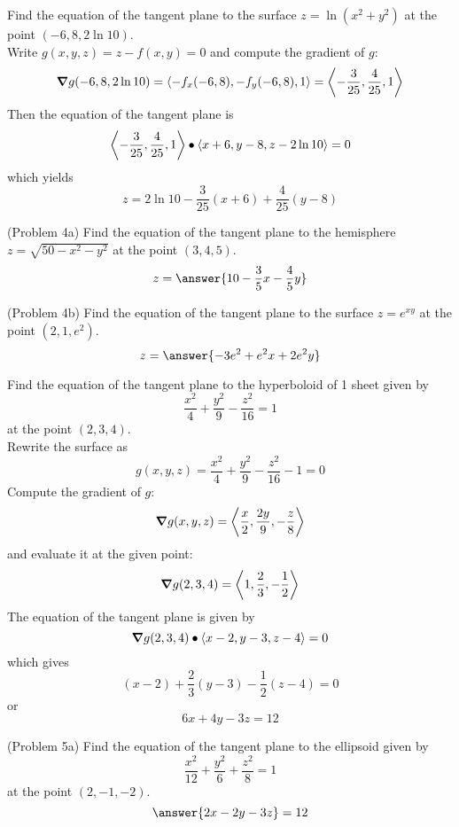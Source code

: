 \documentclass[handout]{ximera}
\begin{document}
\begin{example}[Example 4]
Find the equation of the tangent plane to the surface $z = \ln(x^2 + y^2)$ at the point $(-6, 8, 2\ln 10)$.\\
Write $g(x, y, z) = z - f(x,y) = 0$ and compute the gradient of $g$:
\[
\boldsymbol\nabla g(-6, 8, 2\ln 10) = \left\langle -f_x(-6, 8), -f_y(-6, 8), 1\right\rangle = \left\langle -\frac{3}{25}, \frac{4}{25}, 1\right\rangle
\]
Then the equation of the tangent plane is
\[
\left\langle -\frac{3}{25}, \frac{4}{25}, 1\right\rangle \bullet \left\langle x+6, y-8, z-2\ln 10\right\rangle = 0
\]
which yields
\[
z = 2\ln 10 - \frac{3}{25}(x+6) +\frac{4}{25}(y-8)
\]
\end{example}

\begin{problem}(Problem 4a)
Find the equation of the tangent plane to the hemisphere $z = \sqrt{50 -x^2 - y^2}$ at the point $(3, 4, 5)$.\\
\[
z = \answer{10-\frac35 x - \frac45 y}
\]

\end{problem}


\begin{problem}(Problem 4b)
Find the equation of the tangent plane to the surface $z =e^{xy}$ at the point $(2, 1, e^2)$.\\
\[
z = \answer{-3e^2 + e^2 x + 2e^2 y}
\]
\end{problem}

\begin{example}[Example 5]
Find the equation of the tangent plane to the hyperboloid of 1 sheet given by 
\[
\frac{x^2}{4} + \frac{y^2}{9} - \frac{z^2}{16} = 1
\]
at the point $(2, 3, 4)$.\\
Rewrite the surface as
\[
g(x,y,z) = \frac{x^2}{4} + \frac{y^2}{9} - \frac{z^2}{16} - 1 = 0
\]
Compute the gradient of $g$:
\[
\boldsymbol\nabla g(x,y,z) = \left\langle \frac{x}{2} , \frac{2y}{9}, - \frac{z}{8}\right\rangle
\]
and evaluate it at the given point:
\[
\boldsymbol\nabla g(2,3,4) = \left\langle 1, \frac{2}{3}, -\frac12\right\rangle
\]
The equation of the tangent plane is given by 
\[
\boldsymbol\nabla g(2, 3, 4) \bullet \left\langle x-2, y-3, z-4\right\rangle = 0
\]
which gives
\[
(x-2) + \frac23 (y-3) - \frac12 (z-4) = 0
\]
or
\[
6x + 4y - 3z = 12
\]
\end{example}

\begin{problem}(Problem 5a)
Find the equation of the tangent plane to the ellipsoid given by 
\[
\frac{x^2}{12} + \frac{y^2}{6} + \frac{z^2}{8} = 1
\]
at the point $(2, -1, -2)$.\\
\[
\answer{2x-2y-3z} = 12
\]
\end{problem}
\end{document}
